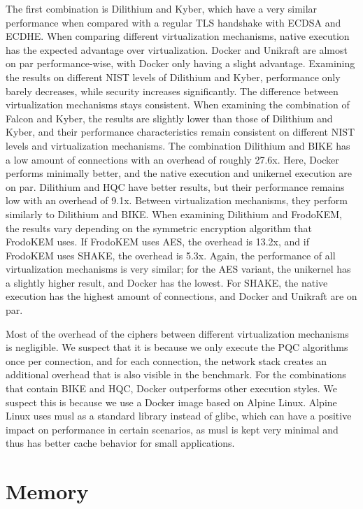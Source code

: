 \documentclass[public,noindent]{aisecreport}
\begin{document}
The first combination is Dilithium and Kyber, which have a very similar performance when compared with a regular TLS handshake with ECDSA and ECDHE. When comparing different virtualization mechanisms, native execution has the expected advantage over virtualization. Docker and Unikraft are almost on par performance-wise, with Docker only having a slight advantage. Examining the results on different NIST levels of Dilithium and Kyber, performance only barely decreases, while security increases significantly. The difference between virtualization mechanisms stays consistent. When examining the combination of Falcon and Kyber, the results are slightly lower than those of Dilithium and Kyber, and their performance characteristics remain consistent on different NIST levels and virtualization mechanisms. The combination Dilithium and BIKE has a low amount of connections with an overhead of roughly 27.6x. Here, Docker performs minimally better, and the native execution and unikernel execution are on par. Dilithium and HQC have better results, but their performance remains low with an overhead of 9.1x. Between virtualization mechanisms, they perform similarly to Dilithium and BIKE. When examining Dilithium and FrodoKEM, the results vary depending on the symmetric encryption algorithm that FrodoKEM uses. If FrodoKEM uses AES, the overhead is 13.2x, and if FrodoKEM uses SHAKE, the overhead is 5.3x. Again, the performance of all virtualization mechanisms is very similar; for the AES variant, the unikernel has a slightly higher result, and Docker has the lowest. For SHAKE, the native execution has the highest amount of connections, and Docker and Unikraft are on par.

Most of the overhead of the ciphers between different virtualization mechanisms is negligible. We suspect that it is because we only execute the PQC algorithms once per connection, and for each connection, the network stack creates an additional overhead that is also visible in the benchmark. For the combinations that contain BIKE and HQC, Docker outperforms other execution styles. We suspect this is because we use a Docker image based on Alpine Linux. Alpine Linux uses musl as a standard library instead of glibc, which can have a positive impact on performance in certain scenarios, as musl is kept very minimal and thus has better cache behavior for small applications.

\section{Memory}
\end{document}
